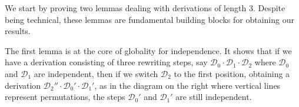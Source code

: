 \documentclass[a4paper,UKenglish,cleveref,pdftex,thm-restate,numberwithinsect]{lipics-v2021}
\newcommand{\dder}[1]{\mathscr{#1}}
\begin{document}
We start by proving two lemmas dealing with derivations of length
$3$. Despite being technical, these lemmas are fundamental building blocks for obtaining our results.

\smallskip

\noindent
\begin{minipage}{.8\textwidth}
  \setlength\parindent{1.5em}
  The first lemma is at the core of globality for independence. It shows that if we have a derivation consisting of three rewriting steps, say $\dder{D}_0\cdot \dder{D}_1 \cdot \dder{D}_2$ where $\dder{D}_0$ and $\dder{D}_1$ are independent, then if we switch $\dder{D}_2$ to the first position, 
obtaining a derivation $\dder{D}_2'' \cdot  \dder{D}_0'\cdot\dder{D}_1'$, as in the diagram on the right where vertical lines represent permutations, the steps $\dder{D}_0'$ and $\dder{D}_1'$ are still independent.
\end{minipage}
\begin{minipage}{.18\textwidth}
\ \hspace{-14mm}
\end{minipage}

\smallskip
\end{document}
